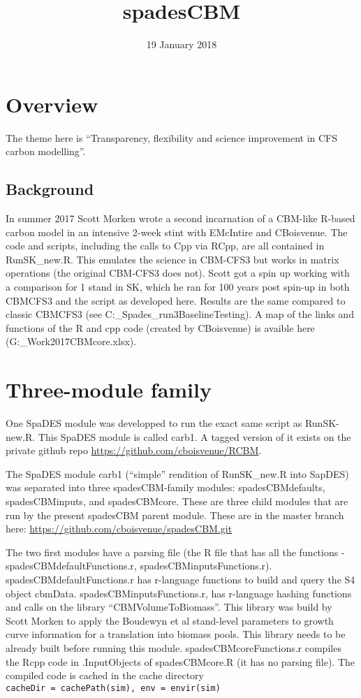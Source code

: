\documentclass[]{article}
\title{spadesCBM}
\author{}
\date{19 January 2018}
\begin{document}
\maketitle

\section{Overview}\label{overview}

The theme here is ``Transparency, flexibility and science improvement in
CFS carbon modelling''.

\subsection{Background}\label{background}

In summer 2017 Scott Morken wrote a second incarnation of a CBM-like
R-based carbon model in an intensive 2-week stint with EMcIntire and
CBoisvenue. The code and scripts, including the calls to Cpp via RCpp,
are all contained in RunSK\_new.R. This emulates the science in CBM-CFS3
but works in matrix operations (the original CBM-CFS3 does not). Scott
got a spin up working with a comparison for 1 stand in SK, which he ran
for 100 years post spin-up in both CBMCFS3 and the script as developed
here. Results are the same compared to classic CBMCFS3 (see
C:\Celine\GitHub\RCBM\data{}\_Spades\_run\CBM3BaselineTesting). A map
of the links and functions of the R and cpp code (created by CBoisvenue)
is avaible here
(G:\RES\_Work\Work\SpaDES\work\RCBMoverview\June2017CBMcore\cbmCoreMap.xlsx).

\section{Three-module family}\label{three-module-family}

One SpaDES module was developped to run the exact same script as
RunSK-new.R. This SpaDES module is called carb1. A tagged version of it
exists on the private github repo
\url{https://github.com/cboisvenue/RCBM}.

The SpaDES module carb1 (``simple'' rendition of RunSK\_new.R into
SapDES) was separated into three spadesCBM-family modules:
spadesCBMdefaults, spadesCBMinputs, and spadesCBMcore. These are three
child modules that are run by the present spadesCBM parent module. These
are in the master branch here:
\url{https://github.com/cboisvenue/spadesCBM.git}

The two first modules have a parsing file (the R file that has all the
functions - spadesCBMdefaultFunctions.r, spadesCBMinputsFunctions.r).
spadesCBMdefaultFunctions.r has r-language functions to build and query
the S4 object cbmData. spadesCBMinputsFunctions.r, has r-language
hashing functions and calls on the library ``CBMVolumeToBiomass''. This
library was build by Scott Morken to apply the Boudewyn et al
stand-level parameters to growth curve information for a translation
into biomass pools. This library needs to be already built before
running this module. spadesCBMcoreFunctions.r compiles the Rcpp code in
.InputObjects of spadesCBMcore.R (it has no parsing file). The compiled
code is cached in the cache directory
\texttt{cacheDir\ =\ cachePath(sim),\ env\ =\ envir(sim)}
\end{document}
